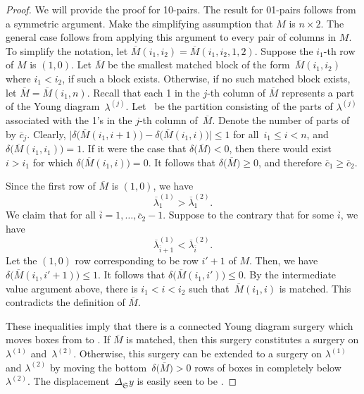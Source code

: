 \documentclass[11pt]{article}
\numberwithin{equation}{section}
\newcommand{\surgery}{\mathfrak S}
\begin{document}
\begin{proof}
We will provide the proof for 10-pairs. The result for 01-pairs follows from a symmetric argument. Make the simplifying assumption that $M$ is $n\times 2$. The general case follows from applying this argument to every pair of columns in $M$. To simplify the notation, let $\overline{M}(i_1, i_2) = \overline{M}(i_1, i_2, 1, 2)$.
Suppose the $i_1$-th row of $M$ is $(1, 0)$. Let $\overline M$ be the smallest matched block of the form~$\overline{M}(i_1, i_2)$ where $i_1 < i_2$, if such a block exists. Otherwise, if no such matched block exists, let $\overline M = \overline{M}(i_1, n)$. Recall that each 1 in the $j$-th column of $\overline M$ represents a part of the Young diagram~$\lambda^{(j)}$. Let~ be the partition consisting of the parts of $\lambda^{(j)}$ associated with the 1's in the $j$-th column of~$\overline M$. Denote the number of parts of  by $\overline{c}_j$. Clearly, $\big|\delta\bigl(\overline{M}(i_1, i + 1)\bigr) - \delta\bigl(\overline{M}(i_1, i)\bigr)\big| \leq 1$ for all~${i_1 \leq i < n}$, and $\delta\bigl(\overline{M}(i_1, i_1)\bigr) = 1$. If it were the case that $\delta\bigl(\overline M\bigr) < 0$, then there would exist~${i > i_1}$ for which $\delta\bigl(\overline{M}(i_1, i)\bigr) = 0$. It follows that $\delta\bigl(\overline M\bigr) \geq 0$, and therefore $\overline{c}_1 \geq \overline{c}_2$.

Since the first row of $\overline M$ is $(1, 0)$, we have
\[
\overline{\lambda}^{(1)}_1 > \overline{\lambda}^{(2)}_1.
\]
 We claim that  for all $\overline{i}=1, \dots , \overline{c}_2 - 1$. Suppose to the contrary that for some $\overline{i}$, we have
\[
\overline{\lambda}^{(1)}_{\overline{i}+1} < \overline{\lambda}^{(2)}_{\overline{i}}.
\] Let the $(1, 0)$ row corresponding to  be row $i'+1$ of $M$. Then, we have
$\delta\bigl(\overline{M}(i_1, i' + 1)\bigr) \leq 1$. It follows that $\delta\bigl(\overline{M}(i_1, i')\bigr) \leq 0$. By the intermediate value argument above, there is $i_1 < i < i_2$ such that~${\overline{M}(i_1, i)}$ is matched. This contradicts the definition of $\overline M$.

These inequalities imply that there is a connected Young diagram surgery which moves  boxes from  to . If $\overline M$ is matched, then this surgery constitutes a surgery on $\lambda^{(1)}$ and~$\lambda^{(2)}$. Otherwise, this surgery can be extended to a surgery on $\lambda^{(1)}$ and $\lambda^{(2)}$ by moving the bottom~${\delta\bigl(\overline{M}\bigr) >0} $ rows of boxes in  completely below $\lambda^{(2)}$. The displacement~$\Delta_\surgery y$ is easily seen to be .
\end{proof}
\end{document}
